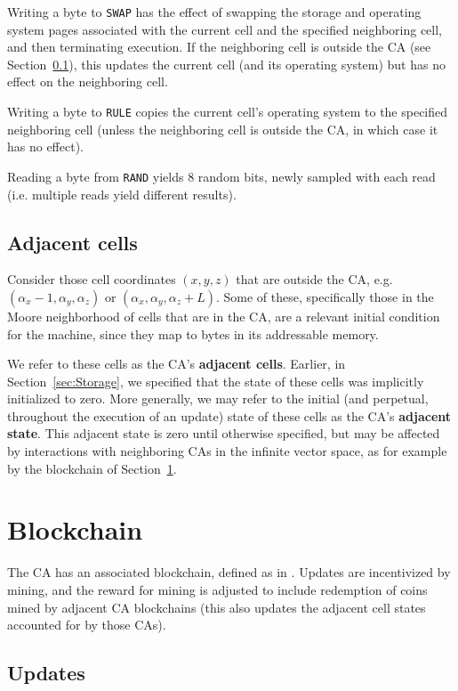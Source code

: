 \documentclass{article}
\newcommand\code[1]{{\tt #1}}
\begin{document}
Writing a byte to \code{SWAP} has the effect of swapping the storage and operating system pages associated with the current cell and the specified neighboring cell,
and then terminating execution.
If the neighboring cell is outside the CA (see Section~\ref{sec:AdjacentCells}),
this updates the current cell (and its operating system) but has no effect on the neighboring cell.

Writing a byte to \code{RULE} copies the current cell's operating system to the specified neighboring cell
(unless the neighboring cell is outside the CA, in which case it has no effect).

Reading a byte from \code{RAND} yields 8 random bits, newly sampled with each read (i.e. multiple reads yield different results).

\subsection{Adjacent cells}
\label{sec:AdjacentCells}

Consider those cell coordinates $(x,y,z)$ that are outside the CA,
e.g. $(\alpha_x-1,\alpha_y,\alpha_z)$ or  $(\alpha_x,\alpha_y,\alpha_z + L)$.
Some of these, specifically those in the Moore neighborhood of cells that are in the CA,
are a relevant initial condition for the machine,
since they map to bytes in its addressable memory.

We refer to these cells as the CA's {\bf adjacent cells}.
Earlier, in Section~\ref{sec:Storage}, we specified that the state of these cells was implicitly initialized to zero.
More generally, we may refer to the initial (and perpetual, throughout the execution of an update)
state of these cells as the CA's {\bf adjacent state}.
This adjacent state is zero until otherwise specified, but may be affected
by interactions with neighboring CAs in the infinite vector space,
as for example by the blockchain of Section~\ref{sec:Blockchain}.

\section{Blockchain}
\label{sec:Blockchain}

The CA has an associated blockchain, defined as in \cite{Nakamoto2008}.
Updates are incentivized by mining,
and the reward for mining is adjusted to include redemption of coins mined by adjacent CA blockchains
(this also updates the adjacent cell states accounted for by those CAs).

\subsection{Updates}
\end{document}
